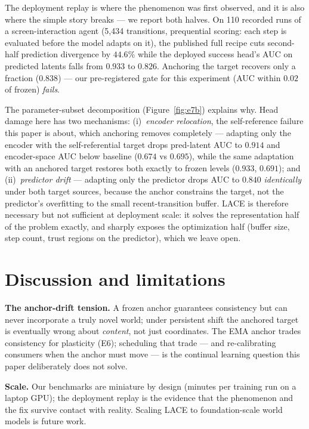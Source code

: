 \documentclass{article}
\newcommand{\lace}{\textsc{LACE}}
\begin{document}
The deployment replay is where the phenomenon was first observed, and it is
also where the simple story breaks --- we report both halves. On 110
recorded runs of a screen-interaction agent (5{,}434 transitions,
prequential scoring: each step is evaluated before the model adapts on it),
the published full recipe cuts second-half prediction divergence by
$44.6\%$ while the deployed success head's AUC on predicted latents falls
from $0.933$ to $0.826$. Anchoring the target recovers only a fraction
($0.838$) --- our pre-registered gate for this experiment
(AUC within $0.02$ of frozen) \emph{fails}.

The parameter-subset decomposition (Figure~\ref{fig:e7b}) explains why.
Head damage here has two mechanisms: (i)~\emph{encoder relocation}, the
self-reference failure this paper is about, which anchoring removes
completely --- adapting only the encoder with the self-referential target
drops pred-latent AUC to $0.914$ and encoder-space AUC below baseline
($0.674$ vs $0.695$), while the same adaptation with an anchored target
restores both exactly to frozen levels ($0.933$, $0.691$); and
(ii)~\emph{predictor drift} --- adapting only the predictor drops AUC to
$0.840$ \emph{identically} under both target sources, because the anchor
constrains the target, not the predictor's overfitting to the small
recent-transition buffer. \lace{} is therefore necessary but not sufficient
at deployment scale: it solves the representation half of the problem
exactly, and sharply exposes the optimization half (buffer size, step count,
trust regions on the predictor), which we leave open.

\section{Discussion and limitations}
\label{sec:discussion}

\textbf{The anchor-drift tension.} A frozen anchor guarantees consistency but
can never incorporate a truly novel world; under persistent shift the anchored
target is eventually wrong about \emph{content}, not just coordinates. The EMA
anchor trades consistency for plasticity (E6); scheduling that trade --- and
re-calibrating consumers when the anchor must move --- is the continual
learning question this paper deliberately does not solve.

\textbf{Scale.} Our benchmarks are miniature by design (minutes per training
run on a laptop GPU); the deployment replay is the evidence that the
phenomenon and the fix survive contact with reality. Scaling LACE to
foundation-scale world models is future work.
\end{document}
